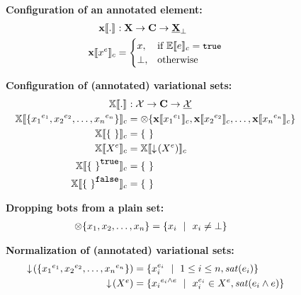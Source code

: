 \begin{figure}
%
\textbf{Configuration of an annotated element:}
\begin{alignat*}{1}
\xeSem [] . &: \elemSet \to \confSet \to \maybe \pelemSet\\
\xeSem {\annot \elem} &=
  \begin{cases}
    \elem, & \If \fSem {\dimMeta} = \t\\
    \bot, &\Otherwise    
  \end{cases}
\end{alignat*}

\medskip
\textbf{Configuration of (annotated) variational sets:}
\begin{alignat*}{1}
\osetSem [] . &: \vsetSet \to \confSet \to \psetSet\\
\osetSem {\setDef{\annot [\dimMeta_1] {\elem_1}, \annot [\dimMeta_2] {\elem_2}, \ldots, \annot [\dimMeta_n] {\elem_n}}} &= \dropbot {\setDef{\xeSem {\annot [\dimMeta_1] {\elem_1}}, 
\xeSem {\annot [\dimMeta_2] {\elem_2}}, \ldots, \xeSem {\annot [\dimMeta_n] {\elem_n}} }}\\
\osetSem {\setDef \ } &= \setDef \ \\
%
\osetSem {\annot {\vset}} &= \osetSem {\pushIn {\annot \vset}}\\
\osetSem {\annot [\t] {\setDef \ }} & = \setDef \ \\
\osetSem {\annot [\f] {\setDef \ }} & = \setDef \ 
\end{alignat*}

\medskip
\textbf{Dropping bots from a plain set:}
\begin{alignat*}{1}
\dropbot {\setDef {\elem_1, \elem_2, \ldots, \elem_n}} &= \setDef {\elem_i \myOR \elem_i \neq \bot}
\end{alignat*}

\medskip 
\textbf{Normalization of (annotated) variational sets:}
\begin{alignat*}{1}
\pushIn {\setDef {\annot [\dimMeta_1] {\elem_1}, \annot [\dimMeta_2] {\elem_2}, \ldots,
\annot [\dimMeta_n] {\elem_n}}} &= \setDef {
\annot [\dimMeta_i] \elem_i \myOR 1 \leq i \leq n, \sat {\dimMeta_i}}\\
\pushIn {\annot \vset} &=
\setDef {\annot [\dimMeta_i \wedge \dimMeta] {\elem_i} \myOR 
\annot [\dimMeta_i] \elem_i \in \annot \vset, \sat {\dimMeta_i \wedge \dimMeta}}
\end{alignat*}


\end{figure}
